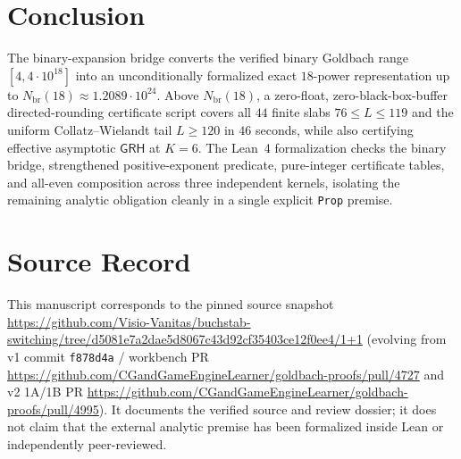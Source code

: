 \documentclass[11pt,a4paper]{article}
\newcommand{\GRH}{\mathsf{GRH}}
\begin{document}
\section{Conclusion}

The binary-expansion bridge converts the verified binary Goldbach range $[4, 4\cdot 10^{18}]$ into an unconditionally formalized exact $18$-power representation up to $N_{\mathrm{br}}(18) \approx 1.2089\cdot 10^{24}$. Above $N_{\mathrm{br}}(18)$, a zero-float, zero-black-box-buffer directed-rounding certificate script covers all $44$ finite slabs $76 \le L \le 119$ and the uniform Collatz--Wielandt tail $L \ge 120$ in $46$ seconds, while also certifying effective asymptotic $\GRH$ at $K = 6$. The Lean~4 formalization checks the binary bridge, strengthened positive-exponent predicate, pure-integer certificate tables, and all-even composition across three independent kernels, isolating the remaining analytic obligation cleanly in a single explicit \texttt{Prop} premise.

\section*{Source Record}

This manuscript corresponds to the pinned source snapshot
\url{https://github.com/Visio-Vanitas/buchstab-switching/tree/d5081e7a2dae5d8067c43d92cf35403ce12f0ee4/1+1}
(evolving from v1 commit \texttt{f878d4a} / workbench PR \url{https://github.com/CGandGameEngineLearner/goldbach-proofs/pull/4727} and v2 1A/1B PR \url{https://github.com/CGandGameEngineLearner/goldbach-proofs/pull/4995}). It documents the verified source and review dossier; it does not claim that the external analytic premise has been formalized inside Lean or independently peer-reviewed.
\end{document}
